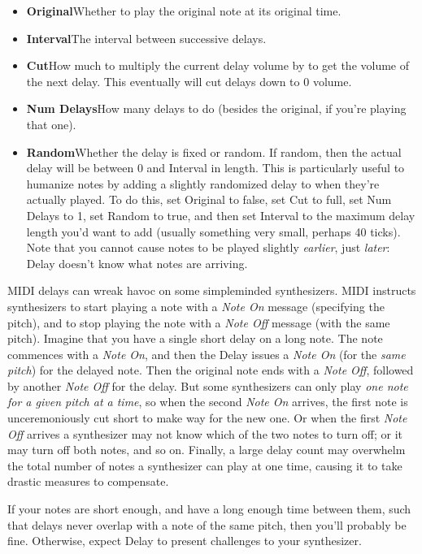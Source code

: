 \documentclass[twoside,10pt]{article}
\begin{document}
\begin{itemize}
\item {\bf Original}\qquad Whether to play the original note at its original time.
\item {\bf Interval}\qquad The interval between successive delays. 
\item {\bf Cut}\qquad How much to multiply the current delay volume by to get the volume of the next delay.  This eventually will cut delays down to 0 volume.
\item {\bf Num Delays}\qquad How many delays to do (besides the original, if you're playing that one).
\item {\bf Random}\qquad Whether the delay is fixed or random.  If random, then the actual delay will be between 0 and Interval in length.  This is particularly useful to humanize notes by adding a slightly randomized delay to when they're actually played.  To do this, set Original to false, set Cut to full, set Num Delays to 1, set Random to true, and then set Interval to the maximum delay length you'd want to add (usually something very small, perhaps 40 ticks).  Note that you cannot cause notes to be played slightly {\it earlier}, just {\it later}: Delay doesn't know what notes are arriving.
\end{itemize}

MIDI delays can wreak havoc on some simpleminded synthesizers.  MIDI instructs synthesizers to start playing a note with a {\it Note On} message (specifying the pitch), and to stop playing the note with a {\it Note Off} message (with the same pitch). Imagine that you have a single short delay on a long note.  The note commences with a {\it Note On}, and then the Delay issues a {\it Note On} (for the {\it same pitch}) for the delayed note.  Then the original note ends with a {\it Note Off}, followed by another {\it Note Off} for the delay.  But some synthesizers can only play {\it one note for a given pitch at a time}, so when the second {\it Note On} arrives, the first note is unceremoniously cut short to make way for the new one.  Or when the first {\it Note Off} arrives a synthesizer may not know which of the two notes to turn off; or it may turn off both notes, and so on.    Finally, a large delay count may overwhelm the total number of notes a synthesizer can play at one time, causing it to take drastic measures to compensate.

If your notes are short enough, and have a long enough time between them, such that delays never overlap with a note of the same pitch, then you'll probably be fine.  Otherwise, expect Delay to present challenges to your synthesizer.
\end{document}
